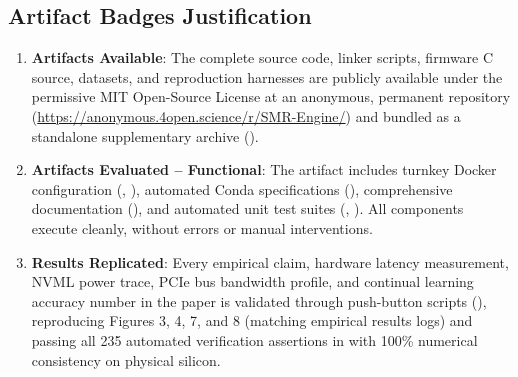 \documentclass{article}
\begin{document}
\subsection{Artifact Badges Justification}
\begin{enumerate}\small\setlength{\itemsep}{2pt}\setlength{\parskip}{0pt}
    \item \textbf{Artifacts Available}: The complete source code, linker scripts, firmware C source, datasets, and reproduction harnesses are publicly available under the permissive MIT Open-Source License at an anonymous, permanent repository (\url{https://anonymous.4open.science/r/SMR-Engine/}) and bundled as a standalone supplementary archive ().
    \item \textbf{Artifacts Evaluated -- Functional}: The artifact includes turnkey Docker configuration (, ), automated Conda specifications (), comprehensive documentation (), and automated unit test suites (, ). All components execute cleanly, without errors or manual interventions.
    \item \textbf{Results Replicated}: Every empirical claim, hardware latency measurement, NVML power trace, PCIe bus bandwidth profile, and continual learning accuracy number in the paper is validated through push-button scripts (), reproducing Figures 3, 4, 7, and 8 (matching empirical results logs) and passing all 235 automated verification assertions in  with 100\% numerical consistency on physical silicon.
\end{enumerate}
\end{document}
